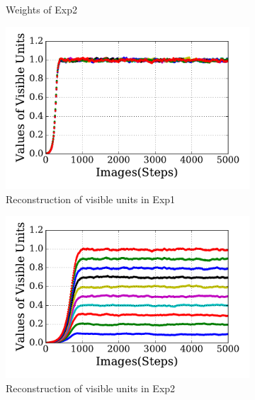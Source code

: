 \begin{figure}
\begin{subfigure}[t]{0.45\textwidth}
		\caption{Weights of Exp2}
	\end{subfigure}
	\begin{subfigure}[t]{0.45\textwidth}
		\includegraphics[width=\textwidth]{pics_sdlm/30_exp_RBM/exp1_recon_non.pdf}
		\caption{Reconstruction of visible units in Exp1}
	\end{subfigure}
	\begin{subfigure}[t]{0.45\textwidth}
		\includegraphics[width=\textwidth]{pics_sdlm/30_exp_RBM/exp2_recon_non.pdf}
		\caption{Reconstruction of visible units in Exp2}
	\end{subfigure}\\
	\begin{subfigure}[t]{0.45\textwidth}

\end{subfigure}
\end{figure}
